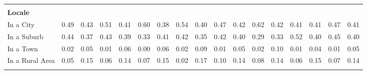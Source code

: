 \begin{tabular*}{\linewidth}{@{\extracolsep{\fill} } lcccccccccccccccc}
&&&&&&&&&&&&&&&&\\%
\multicolumn{17}{l}{\bfseries Locale}\\%
\hspace{0.2cm}In a City&0.49&0.43&0.51&0.41&0.60&0.38&0.54&0.40&0.47&0.42&0.62&0.42&0.41&0.41&0.47&0.41\\%
\hspace{0.2cm}In a Suburb&0.44&0.37&0.43&0.39&0.33&0.41&0.42&0.35&0.42&0.40&0.29&0.33&0.52&0.40&0.45&0.40\\%
\hspace{0.2cm}In a Town&0.02&0.05&0.01&0.06&0.00&0.06&0.02&0.09&0.01&0.05&0.02&0.10&0.01&0.04&0.01&0.05\\%
\hspace{0.2cm}In a Rural Area&0.05&0.15&0.06&0.14&0.07&0.15&0.02&0.17&0.10&0.14&0.08&0.14&0.06&0.15&0.07&0.14\\%
&&&&&&&&&&&&&&&&\\%
\hline%
\end{tabular*}